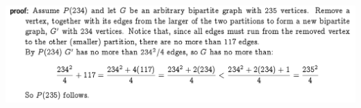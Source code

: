 \documentclass[12pt]{article}
\begin{document}
\begin{enumerate}[a.]
\begin{itemize}
        \begin{center}
        \includegraphics[width=0.8\linewidth]{images/assignment_1_q1a_note.png}
        \end{center}
    \end{itemize}













\end{enumerate}
\end{document}
